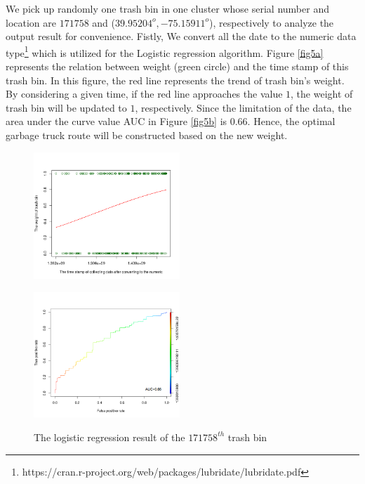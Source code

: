 \documentclass[conference]{IEEEtran}
\begin{document}
We pick up randomly one trash bin in one cluster whose serial number and location are $171758$ and ($39.95204^o,-75.15911^o$), respectively to analyze the output result for convenience. Fistly, We convert all the date to the numeric data type\footnote{https://cran.r-project.org/web/packages/lubridate/lubridate.pdf} which is utilized for the Logistic regression algorithm. Figure \ref{fig5a} represents the relation between weight (green circle) and the time stamp of this trash bin. In this figure, the red line represents the trend of trash bin's weight. By considering a given time, if the red line approaches the value $1$, the weight of trash bin will be updated to $1$, respectively. Since the limitation of the data, the area under the curve value AUC in Figure \ref{fig5b} is 0.66.  Hence, the optimal garbage truck route will be constructed based on the new weight.
\begin{figure}
	\centering

	\begin{minipage}{5.5cm}
	\includegraphics[width=5.5cm]{regression}
	\label{fig5a}
\end{minipage}
	\begin{minipage}{5.5cm}
	\includegraphics[width=5.5cm]{roc}
	\label{fig5b}
\end{minipage}
\label{fig5}
	\caption{The logistic regression result of the $171758^{th}$ trash bin}
\end{figure}
\end{document}
